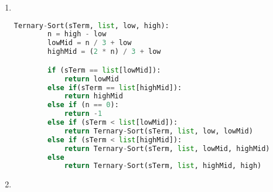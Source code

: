 \documentclass[paper=a4, fontsize=11pt]{scrartcl} %
\numberwithin{equation}{section} %
\numberwithin{figure}{section} %
\numberwithin{table}{section} %
\begin{document}
\begin{enumerate}
    \item \hfill \\
    \begin{lstlisting}[language=Python]
    Ternary-Sort(sTerm, list, low, high):
        n = high - low
        lowMid = n / 3 + low
        highMid = (2 * n) / 3 + low

        if (sTerm == list[lowMid]):
            return lowMid
        else if(sTerm == list[highMid]):
            return highMid
        else if (n == 0):
            return -1
        else if (sTerm < list[lowMid]):
            return Ternary-Sort(sTerm, list, low, lowMid)
        else if (sTerm < list[highMid]):
            return Ternary-Sort(sTerm, list, lowMid, highMid)
        else
            return Ternary-Sort(sTerm, list, highMid, high)
    \end{lstlisting}
    \item \hfill \\
\end{enumerate}
\end{document}
